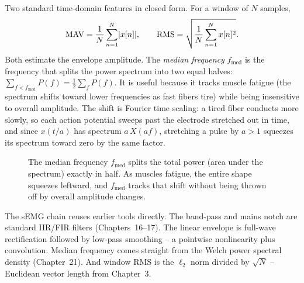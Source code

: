 \begin{formalbox}
Two standard time-domain features in closed form. For a window of $N$ samples,
\[
  \text{MAV} = \frac{1}{N}\sum_{n=1}^{N}\lvert x[n]\rvert,
  \qquad
  \text{RMS} = \sqrt{\frac{1}{N}\sum_{n=1}^{N} x[n]^2}.
\]
Both estimate the envelope amplitude. The \emph{median frequency} $f_{\mathrm{med}}$
is the frequency that splits the power spectrum into two equal halves:
$\sum_{f<f_{\mathrm{med}}} P(f) = \tfrac12 \sum_f P(f)$. It is useful because it
tracks muscle fatigue (the spectrum shifts toward lower frequencies as fast fibers
tire) while being insensitive to overall amplitude. The shift is Fourier time
scaling: a tired fiber conducts more slowly, so each action potential sweeps past the
electrode stretched out in time, and since $x(t/a)$ has spectrum $a\,X(af)$, stretching a
pulse by $a>1$ squeezes its spectrum toward zero by the same factor.
\end{formalbox}

\begin{figure}[htbp]
\centering
{}
\caption{The median frequency $f_{\mathrm{med}}$ splits the total power (area under the spectrum) exactly in half. As muscles fatigue, the entire shape squeezes leftward, and $f_{\mathrm{med}}$ tracks that shift without being thrown off by overall amplitude changes.}
\label{ch37:fig-median-freq}
\end{figure}

\begin{connectionbox}
The sEMG chain reuses earlier tools directly. The band-pass and mains notch
are standard IIR/FIR filters (Chapters~16--17). The linear envelope is full-wave rectification followed by
low-pass smoothing -- a pointwise nonlinearity plus convolution. Median frequency comes straight from the
Welch power spectral density (Chapter~21). And window RMS is the
$\ell_2$ norm divided by $\sqrt{N}$ -- Euclidean vector length from Chapter~3.
\end{connectionbox}

